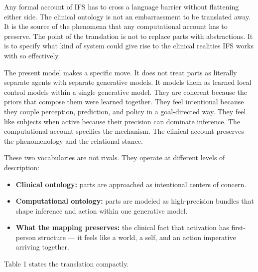 \documentclass[11pt,a4paper]{article}
\providecommand{\tightlist}{%
  \setlength{\itemsep}{0pt}\setlength{\parskip}{0pt}}
\begin{document}
Any formal account of IFS has to cross a language barrier without
flattening either side. The clinical ontology is not an embarrassment to
be translated away. It is the source of the phenomena that any
computational account has to preserve. The point of the translation is
not to replace parts with abstractions. It is to specify what kind of
system could give rise to the clinical realities IFS works with so
effectively.

The present model makes a specific move. It does not treat parts as
literally separate agents with separate generative models. It models
them as learned local control models within a single generative model.
They are coherent because the priors that compose them were learned
together. They feel intentional because they couple perception,
prediction, and policy in a goal-directed way. They feel like subjects
when active because their precision can dominate inference. The
computational account specifies the mechanism. The clinical account
preserves the phenomenology and the relational stance.

These two vocabularies are not rivals. They operate at different levels
of description:

\begin{itemize}
\tightlist
\item
  \textbf{Clinical ontology:} parts are approached as intentional
  centers of concern.
\item
  \textbf{Computational ontology:} parts are modeled as high-precision
  bundles that shape inference and action within one generative model.
\item
  \textbf{What the mapping preserves:} the clinical fact that activation
  has first-person structure --- it feels like a world, a self, and an
  action imperative arriving together.
\end{itemize}

Table 1 states the translation compactly.
\end{document}
